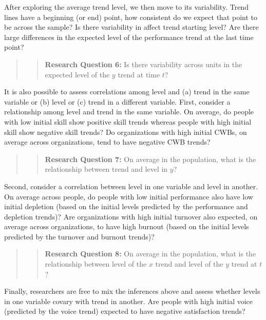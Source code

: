 \documentclass[english,,man]{apa6}
\theoremstyle{definition}
\theoremstyle{definition}
\theoremstyle{definition}
\theoremstyle{remark}
\begin{document}
After exploring the average trend level, we then move to its
variability. Trend lines have a beginning (or end) point, how consistent
do we expect that point to be across the sample? Is there variability in
affect trend starting level? Are there large differences in the expected
level of the performance trend at the last time point?

\begin{quote}
\begin{quote}
\textbf{Research Question 6:} Is there variability across units in the
expected level of the \(y\) trend at time \(t\)?
\end{quote}
\end{quote}

It is also possible to assess correlations among level and (a) trend in
the same variable or (b) level or (c) trend in a different variable.
First, consider a relationship among level and trend in the same
variable. On average, do people with low initial skill show positive
skill trends whereas people with high initial skill show negative skill
trends? Do organizations with high initial CWBs, on average across
organizations, tend to have negative CWB trends?

\begin{quote}
\begin{quote}
\textbf{Research Question 7:} On average in the population, what is the
relationship between trend and level in \(y\)?
\end{quote}
\end{quote}

Second, consider a correlation between level in one variable and level
in another. On average across people, do people with low initial
performance also have low initial depletion (based on the initial levels
predicted by the performance and depletion trends)? Are organizations
with high initial turnover also expected, on average across
organizations, to have high burnout (based on the initial levels
predicted by the turnover and burnout trends)?

\begin{quote}
\begin{quote}
\textbf{Research Question 8:} On average in the population, what is the
relationship between level of the \(x\) trend and level of the \(y\)
trend at \(t\)?
\end{quote}
\end{quote}

Finally, researchers are free to mix the inferences above and assess
whether levels in one variable covary with trend in another. Are people
with high initial voice (predicted by the voice trend) expected to have
negative satisfaction trends?
\end{document}
